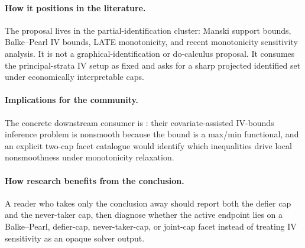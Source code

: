 \documentclass[11pt]{article}
\theoremstyle{definition}
\theoremstyle{plain}
\theoremstyle{remark}
\begin{document}
\paragraph{How it positions in the literature.}
The proposal lives in the partial-identification cluster: Manski support
bounds, Balke--Pearl IV bounds, LATE monotonicity, and recent monotonicity
sensitivity analysis.  It is not a graphical-identification or do-calculus
proposal.  It consumes the principal-strata IV setup as fixed and asks for a
sharp projected identified set under economically interpretable caps.

\paragraph{Implications for the community.}
The concrete downstream consumer is \citet{LevisBonviniZengKeeleKennedy2025}:
their covariate-assisted IV-bounds inference problem is nonsmooth because the
bound is a max/min functional, and an explicit two-cap facet catalogue would
identify which inequalities drive local nonsmoothness under monotonicity
relaxation.

\paragraph{How research benefits from the conclusion.}
A reader who takes only the conclusion away should report both the defier cap
and the never-taker cap, then diagnose whether the active endpoint lies on a
Balke--Pearl, defier-cap, never-taker-cap, or joint-cap facet instead of
treating IV sensitivity as an opaque solver output.
\end{document}
